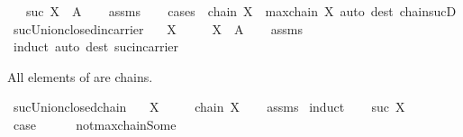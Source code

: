 \begin{isabellebody}
\ \ \ {\isachardoublequoteopen}suc\ X\ {\isasymsubseteq}\ A{\isachardoublequoteclose}\isanewline
%
\isadelimproof
\ \ %
\endisadelimproof
%
\isatagproof
{}\isamarkupfalse%
\ assms\isanewline
\ \ \isamarkupfalse%
\ {\isacharparenleft}{\kern0pt}cases\ {\isachardoublequoteopen}{\isasymnot}\ chain\ X\ {\isasymor}\ maxchain\ X{\isachardoublequoteclose}{\isacharparenright}{\kern0pt}\ {\isacharparenleft}{\kern0pt}auto\ dest{\isacharcolon}{\kern0pt}\ chain{\isacharunderscore}{\kern0pt}sucD{\isacharparenright}{\kern0pt}%
\endisatagproof
{\isafoldproof}%
%
\isadelimproof
\isanewline
%
\endisadelimproof
\isanewline
{}\isamarkupfalse%
\ suc{\isacharunderscore}{\kern0pt}Union{\isacharunderscore}{\kern0pt}closed{\isacharunderscore}{\kern0pt}in{\isacharunderscore}{\kern0pt}carrier{\isacharcolon}{\kern0pt}\isanewline
\ \ \ {\isachardoublequoteopen}X\ {\isasymin}\ {\isasymC}{\isachardoublequoteclose}\isanewline
\ \ \ {\isachardoublequoteopen}X\ {\isasymsubseteq}\ A{\isachardoublequoteclose}\isanewline
%
\isadelimproof
\ \ %
\endisadelimproof
%
\isatagproof
{}\isamarkupfalse%
\ assms\isanewline
\ \ \isamarkupfalse%
\ induct\ {\isacharparenleft}{\kern0pt}auto\ dest{\isacharcolon}{\kern0pt}\ suc{\isacharunderscore}{\kern0pt}in{\isacharunderscore}{\kern0pt}carrier{\isacharparenright}{\kern0pt}%
\endisatagproof
{\isafoldproof}%
%
\isadelimproof
%
\endisadelimproof
%
\begin{isamarkuptext}%
All elements of \isa{{\isasymC}} are chains.%
\end{isamarkuptext}\isamarkuptrue%
\isamarkupfalse%
\ suc{\isacharunderscore}{\kern0pt}Union{\isacharunderscore}{\kern0pt}closed{\isacharunderscore}{\kern0pt}chain{\isacharcolon}{\kern0pt}\isanewline
\ \ \ {\isachardoublequoteopen}X\ {\isasymin}\ {\isasymC}{\isachardoublequoteclose}\isanewline
\ \ \ {\isachardoublequoteopen}chain\ X{\isachardoublequoteclose}\isanewline
%
\isadelimproof
\ \ %
\endisadelimproof
%
\isatagproof
{}\isamarkupfalse%
\ assms\isanewline
{}\isamarkupfalse%
\ induct\isanewline
\ \ \isamarkupfalse%
\ {\isacharparenleft}{\kern0pt}suc\ X{\isacharparenright}{\kern0pt}\isanewline
\ \ \isamarkupfalse%
\ \isamarkupfalse%
\ {\isacharquery}{\kern0pt}case\isanewline
\ \ \ \ \isamarkupfalse%
\ not{\isacharunderscore}{\kern0pt}maxchain{\isacharunderscore}{\kern0pt}Some\ \isamarkupfalse%

\end{isabellebody}
